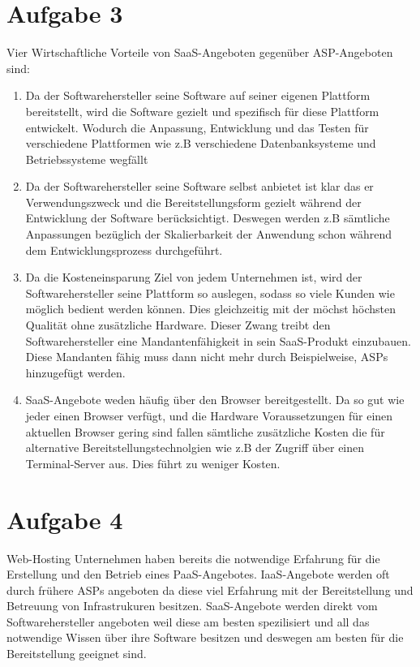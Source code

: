 \documentclass[9pt,a4paper]{article} %
\begin{document}
\section*{Aufgabe 3}
Vier Wirtschaftliche Vorteile von SaaS-Angeboten gegenüber ASP-Angeboten sind:
\begin{enumerate}
	\item Da der Softwarehersteller seine Software auf seiner eigenen Plattform bereitstellt, wird die Software gezielt und spezifisch für diese Plattform entwickelt. Wodurch die Anpassung, Entwicklung und das Testen für verschiedene Plattformen wie z.B verschiedene Datenbanksysteme und Betriebssysteme wegfällt
	\item Da der Softwarehersteller seine Software selbst anbietet ist klar das er Verwendungszweck und die Bereitstellungsform gezielt während der Entwicklung der Software berücksichtigt. Deswegen werden z.B sämtliche Anpassungen bezüglich der Skalierbarkeit der Anwendung schon während dem Entwicklungsprozess durchgeführt.
	\item Da die Kosteneinsparung Ziel von jedem Unternehmen ist, wird der Softwarehersteller seine Plattform so auslegen, sodass so viele Kunden wie möglich bedient werden können. Dies gleichzeitig mit der möchst höchsten Qualität ohne zusätzliche Hardware. Dieser Zwang treibt den Softwarehersteller eine Mandantenfähigkeit in sein SaaS-Produkt einzubauen. Diese Mandanten fähig muss dann nicht mehr durch Beispielweise, ASPs hinzugefügt werden. \newline

		\vspace{3mm}

	\item SaaS-Angebote weden häufig über den Browser bereitgestellt. Da so gut wie jeder einen Browser verfügt, und die Hardware Voraussetzungen für einen aktuellen Browser gering sind fallen sämtliche zusätzliche Kosten die für alternative Bereitstellungstechnolgien wie z.B der Zugriff über einen Terminal-Server aus. Dies führt zu weniger Kosten.
\end{enumerate}

\section*{Aufgabe 4}
Web-Hosting Unternehmen haben bereits die notwendige Erfahrung für die Erstellung und den Betrieb eines PaaS-Angebotes. IaaS-Angebote werden oft durch frühere ASPs angeboten da diese viel Erfahrung mit der Bereitstellung und Betreuung von Infrastrukuren besitzen. SaaS-Angebote werden direkt vom Softwarehersteller angeboten weil diese am besten spezilisiert und all das notwendige Wissen über ihre Software besitzen und deswegen am besten für die Bereitstellung geeignet sind.
\end{document}
